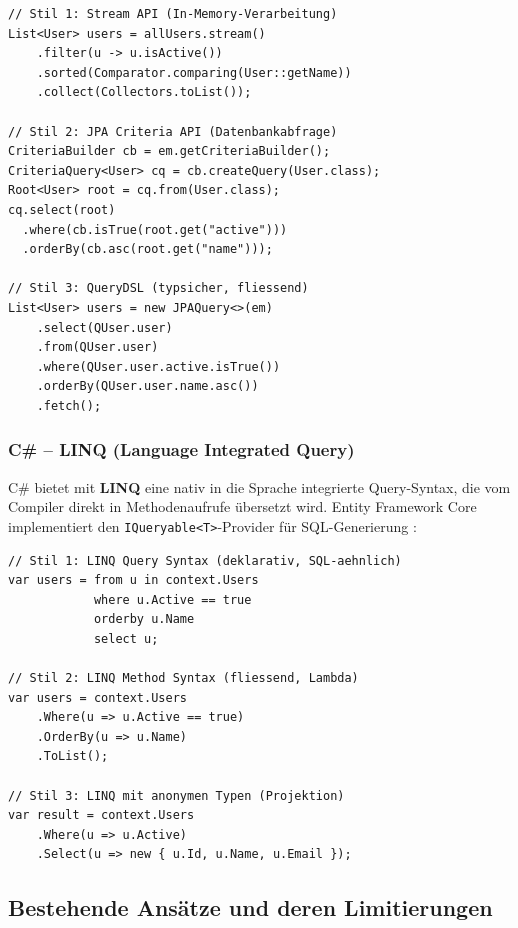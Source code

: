 \begin{lstlisting}[style=javastyle, caption={Java -- Query-Stilarten},
  label=lst:java_styles]
// Stil 1: Stream API (In-Memory-Verarbeitung)
List<User> users = allUsers.stream()
    .filter(u -> u.isActive())
    .sorted(Comparator.comparing(User::getName))
    .collect(Collectors.toList());

// Stil 2: JPA Criteria API (Datenbankabfrage)
CriteriaBuilder cb = em.getCriteriaBuilder();
CriteriaQuery<User> cq = cb.createQuery(User.class);
Root<User> root = cq.from(User.class);
cq.select(root)
  .where(cb.isTrue(root.get("active")))
  .orderBy(cb.asc(root.get("name")));

// Stil 3: QueryDSL (typsicher, fliessend)
List<User> users = new JPAQuery<>(em)
    .select(QUser.user)
    .from(QUser.user)
    .where(QUser.user.active.isTrue())
    .orderBy(QUser.user.name.asc())
    .fetch();
\end{lstlisting}

\subsubsection{C\# -- LINQ (Language Integrated Query)}

C\# bietet mit \textbf{LINQ} eine nativ in die Sprache integrierte
Query-Syntax, die vom Compiler direkt in Methodenaufrufe übersetzt wird.
Entity Framework Core implementiert den \texttt{IQueryable<T>}-Provider
für SQL-Generierung \cite{ef_core_docs,linq_docs}:

\begin{lstlisting}[style=csharpstyle, caption={C\# LINQ -- Query-Stilarten},
  label=lst:cs_styles]
// Stil 1: LINQ Query Syntax (deklarativ, SQL-aehnlich)
var users = from u in context.Users
            where u.Active == true
            orderby u.Name
            select u;

// Stil 2: LINQ Method Syntax (fliessend, Lambda)
var users = context.Users
    .Where(u => u.Active == true)
    .OrderBy(u => u.Name)
    .ToList();

// Stil 3: LINQ mit anonymen Typen (Projektion)
var result = context.Users
    .Where(u => u.Active)
    .Select(u => new { u.Id, u.Name, u.Email });
\end{lstlisting}

\subsection{Bestehende Ansätze und deren Limitierungen}
\label{subsec:bestehend}

